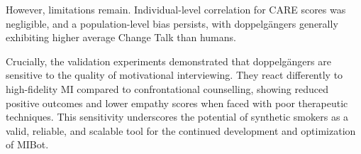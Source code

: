However, limitations remain. Individual-level correlation for CARE scores was negligible, and a population-level bias persists, with doppelgängers generally exhibiting higher average Change Talk than humans.

Crucially, the validation experiments demonstrated that doppelgängers are sensitive to the quality of motivational interviewing. They react differently to high-fidelity MI compared to confrontational counselling, showing reduced positive outcomes and lower empathy scores when faced with poor therapeutic techniques. This sensitivity underscores the potential of synthetic smokers as a valid, reliable, and scalable tool for the continued development and optimization of MIBot.